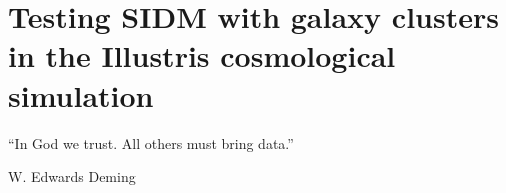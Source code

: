 \doublespacing
\setcounter{chapter}{2}
\chapter{Testing SIDM with galaxy clusters in the Illustris cosmological simulation}{}{}
\label{chapter3}
\epigraph{``In God we trust. All others must bring data.''}{W. Edwards
Deming} 
